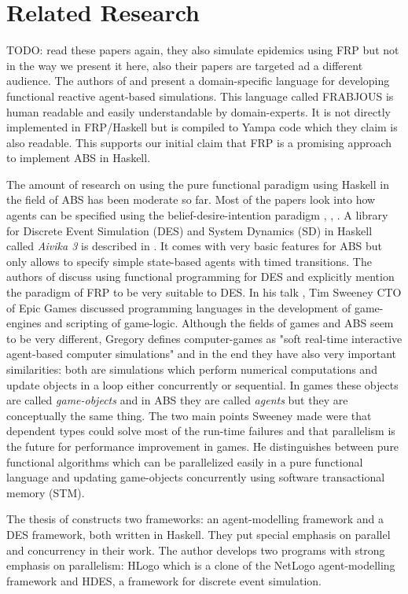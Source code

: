 \section{Related Research}
TODO: read these papers again, they also simulate epidemics using FRP but not in the way we present it here, also their papers are targeted ad a different audience. The authors of \cite{schneider_towards_2012} and \cite{vendrov_frabjous:_2014} present a domain-specific language for developing functional reactive agent-based simulations. This language called FRABJOUS is human readable and easily understandable by domain-experts. It is not directly implemented in FRP/Haskell but is compiled to Yampa code which they claim is also readable. This supports our initial claim that FRP is a promising approach to implement ABS in Haskell.

The amount of research on using the pure functional paradigm using Haskell in the field of ABS has been moderate so far. Most of the papers look into how agents can be specified using the belief-desire-intention paradigm \cite{de_jong_suitability_2014}, \cite{sulzmann_specifying_2007}, \cite{jankovic_functional_2007}. A library for Discrete Event Simulation (DES) and System Dynamics (SD) in Haskell called \textit{Aivika 3} is described in \cite{sorokin_aivika_2015}. It comes with very basic features for ABS but only allows to specify simple state-based agents with timed transitions.
The authors of \cite{jankovic_functional_2007} discuss using functional programming for DES and explicitly mention the paradigm of FRP to be very suitable to DES. 
In his talk \cite{sweeney_next_2006}, Tim Sweeney CTO of Epic Games discussed programming languages in the development of game-engines and scripting of game-logic. Although the fields of games and ABS seem to be very different, Gregory \cite{gregory_game_2018} defines computer-games as "soft real-time interactive agent-based computer simulations" and in the end they have also very important similarities: both are simulations which perform numerical computations and update objects in a loop either concurrently or sequential. In games these objects are called \textit{game-objects} and in ABS they are called \textit{agents} but they are conceptually the same thing. The two main points Sweeney made were that dependent types could solve most of the run-time failures and that parallelism is the future for performance improvement in games. He distinguishes between pure functional algorithms which can be parallelized easily in a pure functional language and updating game-objects concurrently using software transactional memory (STM).

The thesis of \cite{bezirgiannis_improving_2013} constructs two frameworks: an agent-modelling framework and a DES framework, both written in Haskell. They put special emphasis on parallel and concurrency in their work. The author develops two programs with strong emphasis on parallelism: HLogo which is a clone of the NetLogo agent-modelling framework and HDES, a framework for discrete event simulation.
